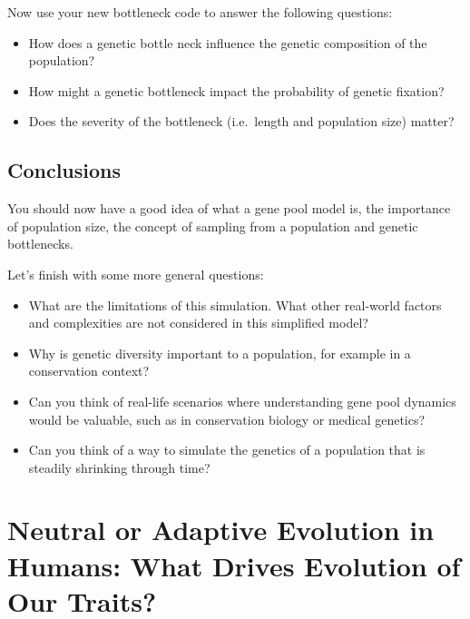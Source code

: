 \documentclass[
  a4paper]{book}
\providecommand{\tightlist}{%
  \setlength{\itemsep}{0pt}\setlength{\parskip}{0pt}}
\begin{document}
Now use your new bottleneck code to answer the following questions:

\begin{itemize}
\tightlist
\item
  How does a genetic bottle neck influence the genetic composition of the population?
\item
  How might a genetic bottleneck impact the probability of genetic fixation?
\item
  Does the severity of the bottleneck (i.e.~length and population size) matter?
\end{itemize}

\section{Conclusions}\label{conclusions}

You should now have a good idea of what a gene pool model is, the importance of population size, the concept of sampling from a population and genetic bottlenecks.

Let's finish with some more general questions:

\begin{itemize}
\tightlist
\item
  What are the limitations of this simulation. What other real-world factors and complexities are not considered in this simplified model?
\end{itemize}

\begin{itemize}
\tightlist
\item
  Why is genetic diversity important to a population, for example in a conservation context?
\end{itemize}

\begin{itemize}
\item
  Can you think of real-life scenarios where understanding gene pool dynamics would be valuable, such as in conservation biology or medical genetics?
\item
  Can you think of a way to simulate the genetics of a population that is steadily shrinking through time?
\end{itemize}

\chapter{Neutral or Adaptive Evolution in Humans: What Drives Evolution of Our Traits?}\label{neutral-or-adaptive-evolution-in-humans-what-drives-evolution-of-our-traits}
\end{document}
